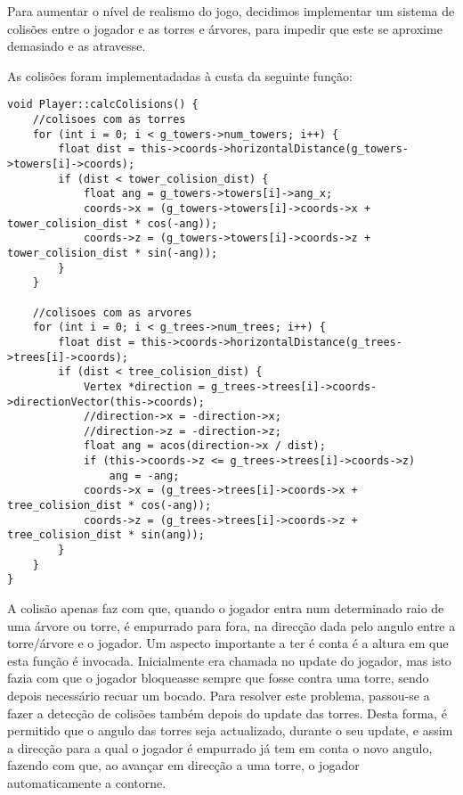 Para aumentar o nível de realismo do jogo, decidimos implementar um sistema de colisões entre o jogador e as torres e árvores, para impedir que este se aproxime demasiado e as atravesse.

As colisões foram implementadadas à custa da seguinte função:

\begin{lstlisting}[caption=Cálculo de colisões]
void Player::calcColisions() {
	//colisoes com as torres
	for (int i = 0; i < g_towers->num_towers; i++) {
		float dist = this->coords->horizontalDistance(g_towers->towers[i]->coords);
		if (dist < tower_colision_dist) {
			float ang = g_towers->towers[i]->ang_x;
			coords->x = (g_towers->towers[i]->coords->x + tower_colision_dist * cos(-ang));
			coords->z = (g_towers->towers[i]->coords->z + tower_colision_dist * sin(-ang));
		}
	}
	
	//colisoes com as arvores
	for (int i = 0; i < g_trees->num_trees; i++) {
		float dist = this->coords->horizontalDistance(g_trees->trees[i]->coords);
		if (dist < tree_colision_dist) {
			Vertex *direction = g_trees->trees[i]->coords->directionVector(this->coords);
			//direction->x = -direction->x;
			//direction->z = -direction->z;
			float ang = acos(direction->x / dist);
			if (this->coords->z <= g_trees->trees[i]->coords->z)
				ang = -ang;
			coords->x = (g_trees->trees[i]->coords->x + tree_colision_dist * cos(-ang));
			coords->z = (g_trees->trees[i]->coords->z + tree_colision_dist * sin(ang));
		}
	}
}
\end{lstlisting}

A colisão apenas faz com que, quando o jogador entra num determinado raio de uma árvore ou torre, é empurrado para fora, na direcção dada pelo angulo entre a torre/árvore e o jogador.
Um aspecto importante a ter é conta é a altura em que esta função é invocada.
Inicialmente era chamada no update do jogador, mas isto fazia com que o jogador bloqueasse sempre que fosse contra uma torre, sendo depois necessário recuar um bocado.
Para resolver este problema, passou-se a fazer a detecção de colisões também depois do update das torres. Desta forma, é permitido que o angulo das torres seja actualizado, durante o seu update, e assim a direcção para a qual o jogador é empurrado já tem em conta o novo angulo, fazendo com que, ao avançar em direcção a uma torre, o jogador automaticamente a contorne.
